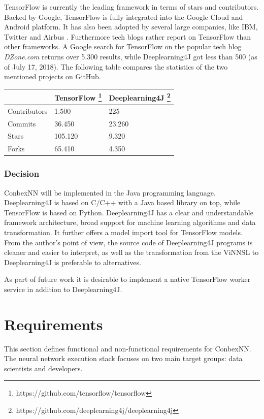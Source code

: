TensorFlow is currently the leading framework in terms of stars and
contributors. Backed by Google, TensorFlow is fully integrated into the
Google Cloud and Android platform. It has also been adopted by several
large companies, like IBM, Twitter and Airbus \cite{dzone-frameworks}.
Furthermore tech blogs rather report on TensorFlow than other
frameworks. A Google search for TensorFlow on the popular tech blog
\emph{DZone.com} returns over 5.300 results, while Deeplearning4J got
less than 500 (as of July 17, 2018). The following table compares the
statistics of the two mentioned projects on GitHub.

\begin{longtable}[]{@{}lll@{}}
\toprule
& TensorFlow \footnote{https://github.com/tensorflow/tensorflow} &
Deeplearning4J \footnote{https://github.com/deeplearning4j/deeplearning4j}\tabularnewline
\midrule
\endhead
Contributors & 1.500 & 225\tabularnewline
Commits & 36.450 & 23.260\tabularnewline
Stars & 105.120 & 9.320\tabularnewline
Forks & 65.410 & 4.350\tabularnewline
\bottomrule
\end{longtable}

\subsection{Decision}\label{decision-1}

ConbexNN will be implemented in the Java programming language.
Deeplearning4J is based on C/C++ with a Java based library on top, while
TensorFlow is based on Python. Deeplearning4J has a clear and
understandable framework architecture, broad support for machine
learning algorithms and data transformation. It further offers a model
import tool for TensorFlow models. From the author's point of view, the
source code of Deeplearning4J programs is cleaner and easier to
interpret, as well as the transformation from the ViNNSL to
Deeplearning4J is preferable to alternatives.

As part of future work it is desirable to implement a native TensorFlow
worker service in addition to Deeplearning4J.

\chapter{Requirements}\label{requirements}

This section defines functional and non-functional requirements for
ConbexNN. The neural network execution stack focuses on two main target
groups: data scientists and developers.

